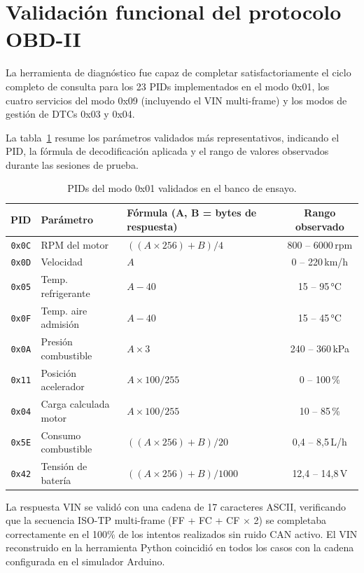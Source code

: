 \section{Validación funcional del protocolo OBD-II}
\label{sec:resultados_protocolo}

La herramienta de diagnóstico fue capaz de completar satisfactoriamente el ciclo completo de consulta para los 23 PIDs implementados en el modo 0x01, los cuatro servicios del modo 0x09 (incluyendo el VIN multi-frame) y los modos de gestión de DTCs 0x03 y 0x04.

La tabla~\ref{tab:pids_validados} resume los parámetros validados más representativos, indicando el PID, la fórmula de decodificación aplicada y el rango de valores observados durante las sesiones de prueba.

\begin{table}[!htbp]
\caption{PIDs del modo 0x01 validados en el banco de ensayo.}
\label{tab:pids_validados}
\centering
\renewcommand{\arraystretch}{1.2}
\begin{tabular}{|c|l|l|c|}
\hline
\textbf{PID} & \textbf{Parámetro} & \textbf{Fórmula (A, B = bytes de respuesta)} & \textbf{Rango observado} \\
\hline
\texttt{0x0C} & RPM del motor & $((A \times 256) + B) / 4$ & 800 -- 6000\,rpm \\
\texttt{0x0D} & Velocidad & $A$ & 0 -- 220\,km/h \\
\texttt{0x05} & Temp. refrigerante & $A - 40$ & 15 -- 95\,°C \\
\texttt{0x0F} & Temp. aire admisión & $A - 40$ & 15 -- 45\,°C \\
\texttt{0x0A} & Presión combustible & $A \times 3$ & 240 -- 360\,kPa \\
\texttt{0x11} & Posición acelerador & $A \times 100 / 255$ & 0 -- 100\,\% \\
\texttt{0x04} & Carga calculada motor & $A \times 100 / 255$ & 10 -- 85\,\% \\
\texttt{0x5E} & Consumo combustible & $((A \times 256) + B) / 20$ & 0,4 -- 8,5\,L/h \\
\texttt{0x42} & Tensión de batería & $((A \times 256) + B) / 1000$ & 12,4 -- 14,8\,V \\
\hline
\end{tabular}
\end{table}

La respuesta VIN se validó con una cadena de 17 caracteres ASCII, verificando que la secuencia ISO-TP multi-frame (FF + FC + CF $\times$ 2) se completaba correctamente en el 100\% de los intentos realizados sin ruido CAN activo. El VIN reconstruido en la herramienta Python coincidió en todos los casos con la cadena configurada en el simulador Arduino.


